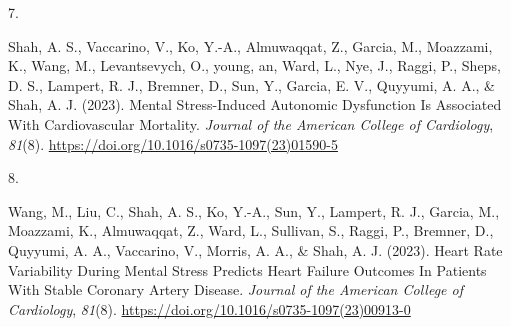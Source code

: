 \documentclass[10pt,a4paper,]{article}
\newlength{\cslhangindent}
\newlength{\csllabelwidth}
\newenvironment{CSLReferences}[2] %
 {\begin{list}{}{%
  \setlength{\itemindent}{0pt}
  \setlength{\leftmargin}{0pt}
  \setlength{\parsep}{0pt}
  \ifodd #1
   \setlength{\leftmargin}{\cslhangindent}
   \setlength{\itemindent}{-1\cslhangindent}
  \fi
  \setlength{\itemsep}{#2\baselineskip}}}
 {\end{list}}
\newcommand{\CSLLeftMargin}[1]{\parbox[t]{\csllabelwidth}{\strut#1\strut}}
\newcommand{\CSLRightInline}[1]{\parbox[t]{\linewidth - \csllabelwidth}{\strut#1\strut}}
\begin{document}
\begin{CSLReferences}{0}{0}
\leavevmode{}%
\CSLLeftMargin{7. }%
\CSLRightInline{Shah, A. S., Vaccarino, V., Ko, Y.-A., Almuwaqqat, Z.,
Garcia, M., Moazzami, K., Wang, M., Levantsevych, O., young, an, Ward,
L., Nye, J., Raggi, P., Sheps, D. S., Lampert, R. J., Bremner, D., Sun,
Y., Garcia, E. V., Quyyumi, A. A., \& Shah, A. J. (2023). Mental
Stress-Induced Autonomic Dysfunction Is Associated With Cardiovascular
Mortality. \emph{Journal of the American College of Cardiology},
\emph{81}(8). \url{https://doi.org/10.1016/s0735-1097(23)01590-5}}

\leavevmode{}%
\CSLLeftMargin{8. }%
\CSLRightInline{Wang, M., Liu, C., Shah, A. S., Ko, Y.-A., Sun, Y.,
Lampert, R. J., Garcia, M., Moazzami, K., Almuwaqqat, Z., Ward, L.,
Sullivan, S., Raggi, P., Bremner, D., Quyyumi, A. A., Vaccarino, V.,
Morris, A. A., \& Shah, A. J. (2023). Heart Rate Variability During
Mental Stress Predicts Heart Failure Outcomes In Patients With Stable
Coronary Artery Disease. \emph{Journal of the American College of
Cardiology}, \emph{81}(8).
\url{https://doi.org/10.1016/s0735-1097(23)00913-0}}

\end{CSLReferences}
\end{document}
